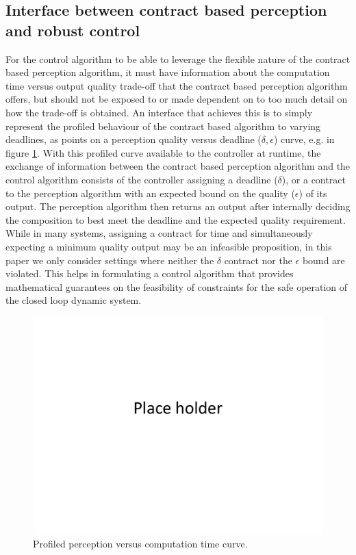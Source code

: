 \subsection{Interface between contract based perception and robust control}

For the control algorithm to be able to leverage the flexible nature of the contract based perception algorithm, it must have information about the computation time versus output quality trade-off that the contract based perception algorithm offers, but should not be exposed to or made dependent on to too much detail on how the trade-off is obtained. An interface that achieves this is to simply represent the profiled behaviour of the contract based algorithm to varying deadlines, as points on a perception quality versus deadline ($\delta, \epsilon$) curve, e.g. in figure \ref{fig:eps_delta_toy}. 
With this profiled curve available to the controller at runtime, the exchange of information between the contract based perception algorithm and the control algorithm consists of the controller assigning a deadline ($\delta$), or a contract to the perception algorithm with an expected bound on the quality ($\epsilon$) of its output. The perception algorithm then returns an output after internally deciding the composition to best meet the deadline and the expected quality requirement. While in many systems, assigning a contract for time and simultaneously expecting a minimum quality output may be an infeasible proposition, in this paper we only consider settings where neither the $\delta$ contract nor the $\epsilon$ bound are violated. This helps in formulating a control algorithm that provides mathematical guarantees on the feasibility of constraints for the safe operation of the closed loop dynamic system.

\begin{figure}[t]
	\centering
	\includegraphics[width=0.7\linewidth]{figures/placeHolder}
	\caption{Profiled perception versus computation time curve.}
	\label{fig:eps_delta_toy}
\end{figure}

